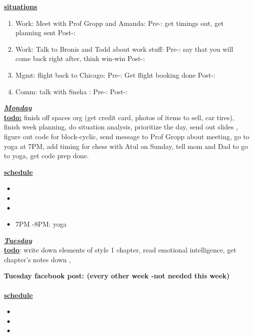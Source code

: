 
\underline{\textbf{situations}}\\
\begin{enumerate}
\item  \small Work: Meet with Prof Gropp and Amanda: Pre-: get timings out, get planning sent  Post-:
\item  \small Work: Talk to Bronis and Todd about work stuff:  Pre-: say that you will come back right after, think win-win Post-:
\item  \small Mgmt: flight back to Chicago:  Pre-:  Get flight booking done Post-:
\item  \small Comm: talk with Sneha : Pre-:   Post-:
\end{enumerate}

\newpage

\underline{\textbf{\textit{Monday}}}\\
\underline{\textbf{todo:}}  finish off spaces org (get credit card,
photos of items to sell, car tires), finish week planning,  do
situation analysis, prioritize the day, send out slides , figure out code for
 block-cyclic, send message to Prof Gropp about meeting, go to yoga at
 7PM, add timing for chess with Atul on Sunday, tell mom and Dad to go
 to yoga, get code prep done.

\underline{\textbf{schedule}}\\
\begin{itemize}
\item
\item
\item
\item 7PM -8PM: yoga
\end{itemize}

\underline{\textbf{\textit{Tuesday}}}\\
\underline{\textbf{todo}}: write down elements of style 1 chapter, read emotional intelligence, get chapter's notes down ,


\textbf{Tuesday facebook post: (every other week -not needed this week)}
\\
\\

\underline{\textbf{schedule}}\\
\begin{itemize}
\item
\item
\item
{}
\end{itemize}

